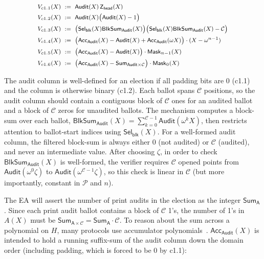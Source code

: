 \begin{mdframed}[linewidth=0.6pt,backgroundcolor=verylightpink,innerleftmargin=6pt,innerrightmargin=6pt,innertopmargin=4pt,innerbottommargin=4pt]
\[
\footnotesize
\begin{aligned}
V_{c1.1}(X)\ &:=\ \mathsf{Audit}(X)\,\mathsf{Z}_{\mathsf{head}}(X)\\
V_{c1.2}(X)\ &:=\ \mathsf{Audit}(X)\bigl(\mathsf{Audit}(X)-1\bigr) \\
V_{c1.3}(X)\ &:=\ \bigl(\mathsf{Sel}_{\mathsf{blk}}(X)\mathsf{BlkSum}_{\mathsf{Audit}}(X)\bigr)\bigl(\mathsf{Sel}_{\mathsf{blk}}(X)\mathsf{BlkSum}_{\mathsf{Audit}}(X)-\mathcal{C}\bigr) \\
V_{c1.4}(X)\ &:=\ \bigl(\mathsf{Acc}_{\mathsf{Audit}}(X)-\mathsf{Audit}(X)+\mathsf{Acc}_{\mathsf{Audit}}(\omega X)\bigr)\cdot(X-\omega^{n-1})\\
V_{c1.5}(X)\ &:=\ \bigl(\mathsf{Acc}_{\mathsf{Audit}}(X)-\mathsf{Audit}(X)\bigr)\cdot \mathsf{Mask}_{n-1}(X)\\
V_{c1.6}(X)\ &:=\ \bigl(\mathsf{Acc}_{\mathsf{Audit}}(X)-\mathsf{Sum}_{\mathsf{Audit}\times\mathcal{C}}\bigr)\cdot \mathsf{Mask}_{0}(X)
\end{aligned}
\]
\end{mdframed}

\noindent The audit column is well-defined for an election if all padding bits are 0 (c1.1) and the column is otherwise binary (c1.2). Each ballot spans $\mathcal{C}$ positions, so the audit column should contain a contiguous block of $\mathcal{C}$ ones for an audited ballot and a block of $\mathcal{C}$ zeros for unaudited ballots. The mechanism computes a block-sum over each ballot, $\mathsf{BlkSum}_{\mathsf{Audit}}(X)=\sum_{k=0}^{\mathcal{C}-1}\mathsf{Audit}(\omega^k X)$, then restricts attention to ballot-start indices using $\mathsf{Sel}_{\mathsf{blk}}(X)$. For a well-formed audit column, the filtered block-sum is always either $0$ (not audited) or $\mathcal{C}$ (audited), and never an intermediate value. After choosing $\zeta$, in order to check $\mathsf{BlkSum}_{\mathsf{Audit}}(X)$ is well-formed, the verifier requires $\mathcal{C}$ opened points from $\mathsf{Audit}(\omega^0\zeta)$ to $\mathsf{Audit}(\omega^{\mathcal{C}-1}\zeta)$, so this check is linear in $\mathcal{C}$ (but more importantly, constant in $\mathcal{P}$ and $n$).

The EA will assert the number of print audits in the election as the integer $\mathsf{Sum}_\mathsf{A}$. Since each print audit ballot contains a block of $\mathcal{C}$ 1's, the number of 1's in $A(X)$ must be $\mathsf{Sum}_{\mathsf{A}\times\mathcal{C}}=\mathsf{Sum}_\mathsf{A}\cdot\mathcal{C}$. To reason about the sum across a polynomial on $H$, many protocols use accumulator polynomials~\cite{GWC19,BFGW19}. $\mathsf{Acc}_{\mathsf{Audit}}(X)$ is intended to hold a running suffix-sum of the audit column down the domain order (including padding, which is forced to be $0$ by c1.1):

